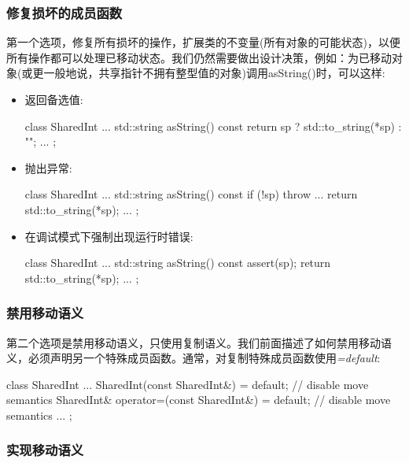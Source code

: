 \subsubsection{修复损坏的成员函数}

第一个选项，修复所有损坏的操作，扩展类的不变量(所有对象的可能状态)，以便所有操作都可以处理已移动状态。我们仍然需要做出设计决策，例如：为已移动对象(或更一般地说，共享指针不拥有整型值的对象)调用asString()时，可以这样:

\begin{itemize}
	\item 返回备选值:

	\begin{cppcode}
class SharedInt {
	...
	std::string asString() const {
		return sp ? std::to_string(*sp) : "";
	}
	...
};
	\end{cppcode}
	\item 抛出异常:

	\begin{cppcode}
class SharedInt {
	...
	std::string asString() const {
		if (!sp) throw ...
		return std::to_string(*sp);
	}
	...
};
	\end{cppcode}
	\item 在调试模式下强制出现运行时错误:

	\begin{cppcode}
class SharedInt {
	...
	std::string asString() const {
		assert(sp);
		return std::to_string(*sp);
	}
	...
};
	\end{cppcode}
\end{itemize}

\subsubsection{禁用移动语义}

第二个选项是禁用移动语义，只使用复制语义。我们前面描述了如何禁用移动语义，必须声明另一个特殊成员函数。通常，对复制特殊成员函数使用\textit{=default}:

\begin{cppcode}
class SharedInt {
	...
	SharedInt(const SharedInt&) = default; // disable move semantics
	SharedInt& operator=(const SharedInt&) = default; // disable move semantics
	...
};
\end{cppcode}

\subsubsection{实现移动语义}

